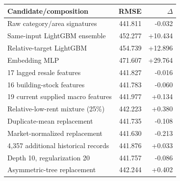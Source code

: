 \begin{tabular}{lrr}
\toprule
Candidate/composition & RMSE & $\Delta$ \\
\midrule
Raw category/area signatures & 441.811 & -0.032 \\
Same-input LightGBM ensemble & 452.277 & +10.434 \\
Relative-target LightGBM & 454.739 & +12.896 \\
Embedding MLP & 471.607 & +29.764 \\
17 lagged resale features & 441.827 & -0.016 \\
16 building-stock features & 441.783 & -0.060 \\
19 current supplied macro features & 441.977 & +0.134 \\
Relative-low-rent mixture (25\%) & 442.223 & +0.380 \\
Duplicate-mean replacement & 441.735 & -0.108 \\
Market-normalized replacement & 441.630 & -0.213 \\
4,357 additional historical records & 441.876 & +0.033 \\
Depth 10, regularization 20 & 441.757 & -0.086 \\
Asymmetric-tree replacement & 442.244 & +0.402 \\
\bottomrule
\end{tabular}
